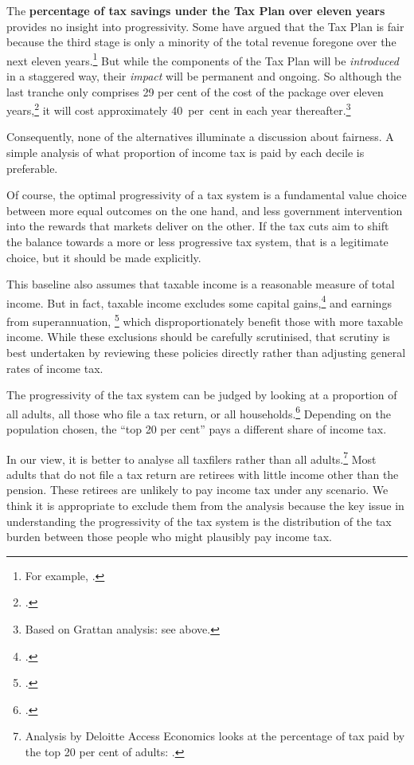 \documentclass[submission]{grattan}\usepackage[]{graphicx}\usepackage[]{color}
\begin{document}
The \textbf{percentage of tax savings under the Tax Plan over eleven years} provides no insight into progressivity. Some have argued that the Tax Plan is fair because the third stage is only a minority of the total revenue foregone over the next eleven years.\footnote{For example, \textcite{Kelly2018}.}
But while the components of the Tax Plan will be \emph{introduced} in a staggered way, their \emph{impact} will be permanent and ongoing. So although the last tranche only comprises 29 per cent of the cost of the package over eleven years,\footcite[][2]{Treasury2018c}
it will cost approximately 40~per~cent in each year thereafter.\footnote{Based on Grattan analysis: see  above.}

Consequently, none of the alternatives illuminate a discussion about fairness. A simple analysis of what proportion of income tax is paid by each decile is preferable.

Of course, the optimal progressivity of a tax system is a fundamental value choice between more equal outcomes on the one hand, and less government intervention into the rewards that markets deliver on the other. If the tax cuts aim to shift the balance towards a more or less progressive tax system, that is a legitimate choice, but it should be made explicitly.

This baseline also assumes that taxable income is a reasonable measure of total income. But in fact, taxable income excludes some capital gains,\footcite{DaleyWood2016-Negative-Gearing-CGT} and earnings from superannuation,%
  \footcites{DaleyCoatesWood-2015-Super-tax-targeting}{Daley-etal-2016-Assessing-2016-super-tax-reforms} which disproportionately benefit those with more taxable income. While these exclusions should be carefully scrutinised, that scrutiny is best undertaken by reviewing these policies directly rather than adjusting general rates of income tax.

The progressivity of the tax system can be judged by looking at a proportion of all adults, all those who file a tax return, or all households.\footcite{Gothe}
Depending on the population chosen, the ``top 20 per cent'' pays a different share of income tax.

In our view, it is better to analyse all taxfilers rather than all adults.\footnote{Analysis by Deloitte Access Economics looks at the percentage of tax paid by the top 20 per cent of adults: \textcite{Greber}.}
Most adults that do not file a tax return are retirees with little income other than the pension. These retirees are unlikely to pay income tax under any scenario. We think it is appropriate to exclude them from the analysis because the key issue in understanding the progressivity of the tax system is the distribution of the tax burden between those people who might plausibly pay income tax.
\end{document}
